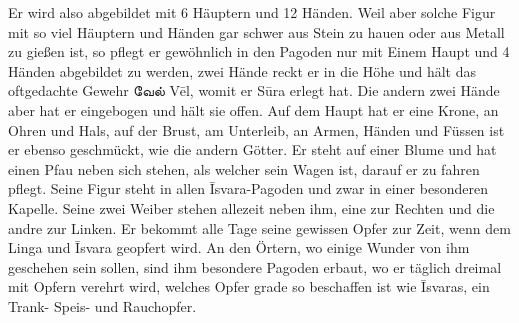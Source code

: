 \documentclass{article}
\newcommand{\TamilText}[1]{\texttamil{#1}}
\newcommand{\tam}[1]{\TamilText{#1}}
\begin{document}
Er wird also abgebildet mit 6 Häuptern und 12 Händen. Weil aber solche Figur mit so viel Häuptern und Händen gar schwer aus Stein zu hauen oder aus Metall zu gießen ist, so pflegt er gewöhnlich in den Pagoden nur mit Einem Haupt und 4 Händen abgebildet zu werden, zwei Hände reckt er in die Höhe und hält das oftgedachte Gewehr \tam{வேல்} V\={e}l, womit er S\={u}ra erlegt hat. Die andern zwei Hände aber hat er eingebogen und hält sie offen. Auf dem Haupt hat er eine Krone, an Ohren und Hals, auf der Brust, am Unterleib, an Armen, Händen und Füssen ist er ebenso geschmückt, wie die andern Götter. Er steht auf einer Blume und hat einen Pfau neben sich stehen, als welcher sein Wagen ist, darauf er zu fahren pflegt. Seine Figur steht in allen \={I}svara-Pagoden und zwar in einer besonderen Kapelle. Seine zwei Weiber stehen allezeit neben ihm, eine zur Rechten und die andre zur Linken. Er bekommt alle Tage seine gewissen Opfer zur Zeit, wenn dem Linga und \={I}svara geopfert wird. An den Örtern, wo einige Wunder von ihm geschehen sein sollen, sind ihm besondere Pagoden erbaut, wo er täglich dreimal mit Opfern verehrt wird, welches Opfer grade so beschaffen ist wie \={I}svaras, ein Trank- Speis- und Rauchopfer.
\end{document}
